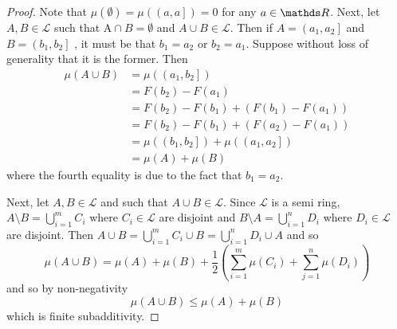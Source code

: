 \begin{proof}
Note that $\mu\left(\emptyset\right)=\mu\left(\left(a,a\right]\right)=0$
for any $a\in\R$. Next, let $A,B\in\mathcal{L}$ such that $\text{A}\cap B=\emptyset$
and $A\cup B\in\mathcal{L}$. Then if $A=\left(a_{1},a_{2}\right]$
and $B=\left(b_{1},b_{2}\right]$ , it must be that $b_{1}=a_{2}$
or $b_{2}=a_{1}.$ Suppose without loss of generality that it is the
former. Then
\begin{align*}
\mu\left(A\cup B\right) & =\mu\left(\left(a_{1},b_{2}\right]\right)\\
 & =F\left(b_{2}\right)-F\left(a_{1}\right)\\
 & =F\left(b_{2}\right)-F\left(b_{1}\right)+\left(F\left(b_{1}\right)-F\left(a_{1}\right)\right)\\
 & =F\left(b_{2}\right)-F\left(b_{1}\right)+\left(F\left(a_{2}\right)-F\left(a_{1}\right)\right)\\
 & =\mu\left(\left(b_{1},b_{2}\right]\right)+\mu\left(\left(a_{1},a_{2}\right]\right)\\
 & =\mu\left(A\right)+\mu\left(B\right)
\end{align*}
where the fourth equality is due to the fact that $b_{1}=a_{2}.$

Next, let $A,B\in\mathcal{L}$ and such that $A\cup B\in\mathcal{L}.$
Since $\mathcal{L}$ is a semi ring, $A\setminus B=\bigcup_{i=1}^{m}C_{i}$
where $C_{i}\in\mathcal{L}$ are disjoint and $B\setminus A=\bigcup_{i=1}^{n}D_{i}$
where $D_{i}\in\mathcal{L}$ are disjoint. Then $A\cup B=\bigcup_{i=1}^{m}C_{i}\cup B=\bigcup_{i=1}^{n}D_{i}\cup A$
and so 
\[
\mu\left(A\cup B\right)=\mu\left(A\right)+\mu\left(B\right)+\frac{1}{2}\left(\sum_{i=1}^{m}\mu\left(C_{i}\right)+\sum_{j=1}^{n}\mu\left(D_{i}\right)\right)
\]
and so by non-negativity
\[
\mu\left(A\cup B\right)\leq\mu\left(A\right)+\mu\left(B\right)
\]
which is finite subadditivity.


\end{proof}
